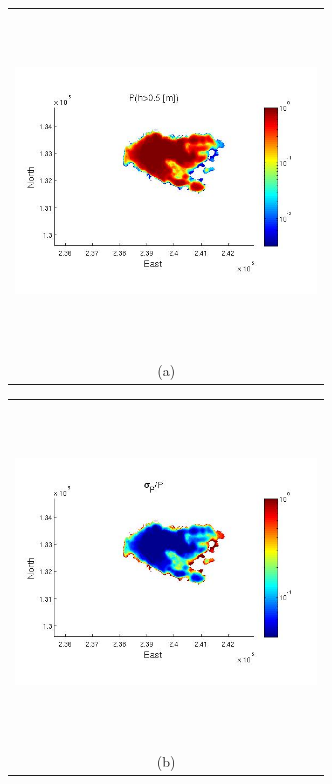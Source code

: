 \documentclass[12pt]{article}
\newcommand{\Pic}[2][0.85]{\begin{center}\texttt{[image: \#2]}
 \end{center} }
\begin{document}
\begin{figure}[H]
    \begin{minipage}[b]{0.6\textwidth}
        \begin{tabular}{c}
       \includegraphics[width=8cm,height=9cm,keepaspectratio]{figs/Galeras_0_P_5m.jpg}\\
        (a)
        \end{tabular}
    \end{minipage}
    \begin{minipage}{0.6\textwidth}
        \begin{tabular}{c}
	\includegraphics[width=8cm,height=9cm,keepaspectratio]{figs/Galeras_0_sigma_5m.jpg}\\
        (b)

\end{tabular}
\end{minipage}
\end{figure}
\end{document}
